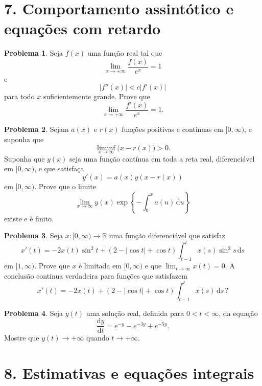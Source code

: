 \documentclass[10pt,a4paper]{amsart}
\newcommand{\R}{\mathbb{R}}
\renewcommand{\d}{\mathrm{d}}
\theoremstyle{definition}
\newtheorem{problema}{Problema}
\begin{document}
\section*{7. Comportamento assintótico e equações com retardo}

\begin{problema}
Seja $f(x)$ uma função real tal que
\[
    \lim_{x\to+\infty}\frac{f(x)}{e^x}=1
\]
e
\[
    |f''(x)|<c|f'(x)|
\]
para todo $x$ suficientemente grande. Prove que
\[
    \lim_{x\to+\infty}\frac{f'(x)}{e^x}=1.
\]
\end{problema}

\begin{problema}
Sejam $a(x)$ e $r(x)$ funções positivas e contínuas em $[0,\infty)$, e
suponha que
\[
    \liminf_{x\to\infty}\bigl(x-r(x)\bigr)>0.
\]
Suponha que $y(x)$ seja uma função contínua em toda a reta real,
diferenciável em $[0,\infty)$, e que satisfaça
\[
    y'(x)=a(x)y(x-r(x))
\]
em $[0,\infty)$. Prove que o limite
\[
    \lim_{x\to\infty} y(x)\exp\left\{-\int_0^x a(u)\,\d u\right\}
\]
existe e é finito.
\end{problema}

\begin{problema}
Seja $x:[0,\infty)\to\R$ uma função diferenciável que satisfaz
\[
    x'(t)
    =
    -2x(t)\sin^2 t
    +
    (2-|\cos t|+\cos t)
    \int_{t-1}^{t} x(s)\sin^2 s\,\d s
\]
em $[1,\infty)$. Prove que $x$ é limitada em $[0,\infty)$ e que
$\lim_{t\to\infty}x(t)=0$. A conclusão continua verdadeira para funções que
satisfazem
\[
    x'(t)
    =
    -2x(t)
    +
    (2-|\cos t|+\cos t)
    \int_{t-1}^{t}x(s)\,\d s\,?
\]
\end{problema}

\begin{problema}
Seja $y(t)$ uma solução real, definida para $0<t<\infty$, da equação
\[
    \frac{\d y}{\d t}=e^{-y}-e^{-3y}+e^{-5y}.
\]
Mostre que $y(t)\to+\infty$ quando $t\to+\infty$.
\end{problema}

\section*{8. Estimativas e equações integrais}
\end{document}
